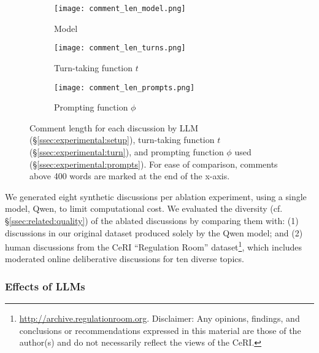 \begin{figure*}[t]
    \begin{subfigure}{0.32\linewidth}
        \texttt{[image: comment\_len\_model.png]}
        \caption{Model}
        \label{fig:comment_length_model}
    \end{subfigure}%
    \hfill
    \begin{subfigure}{0.32\linewidth}
        \texttt{[image: comment\_len\_turns.png]}
        \caption{Turn-taking function $t$}
        \label{fig:comment_length_turns}
    \end{subfigure}%
    \hfill
    \begin{subfigure}{0.32\linewidth}
        \texttt{[image: comment\_len\_prompts.png]}
        \caption{Prompting function $\phi$}
        \label{fig:comment_length_prompts}
    \end{subfigure}%

    \caption{Comment length for each discussion by \ac{LLM} (\S\ref{ssec:experimental:setup}), turn-taking function $t$ (\S\ref{ssec:experimental:turn}), and prompting function $\phi$ used (\S\ref{ssec:experimental:prompts}). For ease of comparison, comments above 400 words are marked at the end of the x-axis.}
    \label{fig:comment_length}
\end{figure*}


We generated eight synthetic discussions per ablation experiment, using a single model, Qwen, to limit computational cost. We evaluated the diversity (cf. \S\ref{ssec:related:quality}) of the ablated discussions by comparing them with: (1) discussions in our original dataset produced solely by the Qwen model; and (2) human discussions from the \ac{CeRI} “Regulation Room” dataset\footnote{\url{http://archive.regulationroom.org}. Disclaimer: Any opinions, findings, and conclusions or recommendations expressed in this material are those of the author(s) and do not necessarily reflect the views of the \ac{CeRI}.}, which includes moderated online deliberative discussions for ten diverse topics.


\subsubsection{Effects of LLMs}

